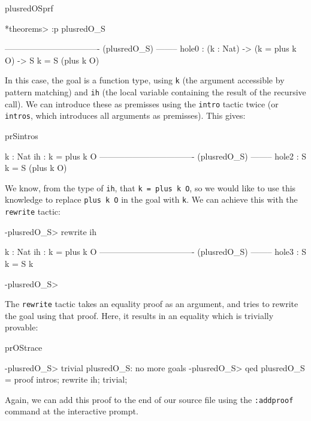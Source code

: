 \begin{SaveVerbatim}{plusredOSprf}

*theorems> :p plusredO_S 

---------------------------------- (plusredO_S) --------
{hole0} : (k : Nat) -> (k = plus k O) -> S k = S (plus k O)

\end{SaveVerbatim}

\noindent
In this case, the goal is a function type, using \texttt{k} (the argument accessible by
pattern matching) and \texttt{ih} (the local variable containing the result of
the recursive call). We can introduce these as premisses using the \texttt{intro} tactic
twice (or \texttt{intros}, which introduces all arguments as premisses). This gives:

\begin{SaveVerbatim}{prSintros}

  k : Nat
  ih : k = plus k O
---------------------------------- (plusredO_S) --------
{hole2} : S k = S (plus k O)

\end{SaveVerbatim}

\noindent
We know, from the type of \texttt{ih}, that \texttt{k = plus k O}, so we would like to
use this knowledge to replace \texttt{plus k O} in the goal with \texttt{k}. We can
achieve this with the \texttt{rewrite} tactic:

\begin{SaveVerbatim}{}

-plusredO_S> rewrite ih 

  k : Nat
  ih : k = plus k O
---------------------------------- (plusredO_S) --------
{hole3} : S k = S k

-plusredO_S>  

\end{SaveVerbatim}
\useverb{}

\noindent
The \texttt{rewrite} tactic takes an equality proof as an argument, and tries to rewrite
the goal using that proof. Here, it results in an equality which is trivially provable:

\begin{SaveVerbatim}{prOStrace}

-plusredO_S> trivial 
plusredO_S: no more goals
-plusredO_S> qed 
plusredO_S = proof {
    intros;
    rewrite ih;
    trivial;
}

\end{SaveVerbatim}

\noindent
Again, we can add this proof to the end of our source file using the \texttt{:addproof}
command at the interactive prompt.
